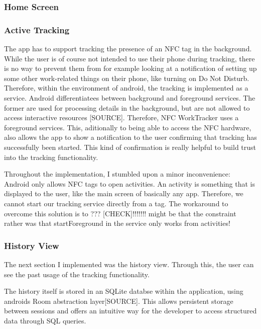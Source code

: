 \documentclass[conference]{IEEEtran}
\newcommand{\projectname}{NFC WorkTracker}
\begin{document}
\subsubsection{Home Screen}

\subsubsection{Active Tracking}
The app has to support tracking the presence of an NFC tag in the background. While the user is of course not intended to use their phone during tracking, there is no way to prevent them from for example looking at a notification of setting up some other work-related things on their phone, like turning on Do Not Disturb. Therefore, within the environment of android, the tracking is implemented as a service. Android differentiatees between background and foreground services. The former are used for processing details in the background, but are not allowed to access interactive resources [SOURCE]. Therefore, \projectname{} uses a foreground services. This, aditionally to being able to access the NFC hardware, also allows the app to show a notification to the user confirming that tracking has successfully been started. This kind of confirmation is really helpful to build trust into the tracking functionality.

Throughout the implementation, I stumbled upon a minor inconvenience: Android only allows NFC tags to open activities. An activity is something that is displayed to the user, like the main screen of basically any app. Therefore, we cannot start our tracking service directly from a tag. The workaround to overcome this solution is to ??? [CHECK]!!!!!!! might be that the constraint rather was that startForeground in the service only works from activities!


\subsubsection{History View}
The next section I implemented was the history view. Through this, the user can see the past usage of the tracking functionality.

The history itself is stored in an SQLite databse within the application, using androids Room abstraction layer[SOURCE]. This allows persistent storage between sessions and offers an intuitive way for the developer to access structured data through SQL queries.
\end{document}

